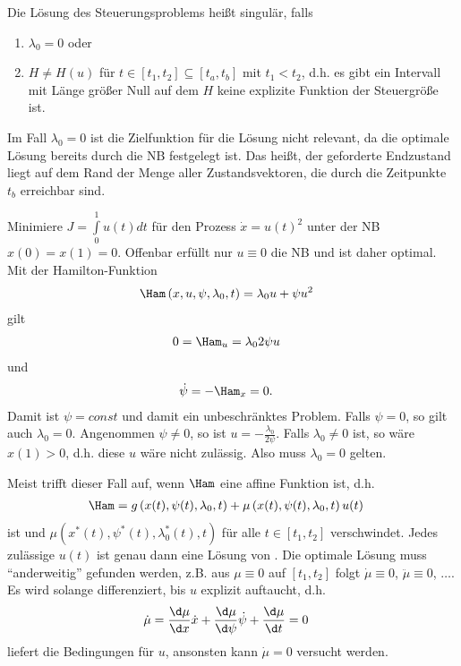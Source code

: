 \begin{defi}
Die Lösung des Steuerungsproblems heißt singulär, falls
\begin{enumerate}[label=(\Roman*)]
  \item $\lambda_0=0$ oder
  \item $H\neq H(u)$ für $t\in[t_1,t_2]\subseteq[t_a,t_b]$ mit $t_1<t_2$, d.h. es gibt ein Intervall mit Länge größer Null auf dem $H$ keine
  explizite Funktion der Steuergröße ist.
\end{enumerate}
\end{defi}

\begin{remark}
Im Fall $\lambda_0=0$ ist die Zielfunktion für die Lösung nicht relevant, da die optimale Lösung bereits durch die \ac{NB} festgelegt ist. Das heißt,
der geforderte Endzustand liegt auf dem Rand der Menge aller Zustandsvektoren, die durch die Zeitpunkte $t_b$ erreichbar sind. 
\end{remark}

\begin{exmp}
Minimiere $J = \int\limits_0^1 u(t)dt$ für den Prozess $\dot{x}=u(t)^2$ unter der \ac{NB} $x(0)=x(1)=0$. Offenbar erfüllt nur $u\equiv 0$ die \ac{NB}
und ist daher optimal. Mit der Hamilton-Funktion
\begin{align*}
	\Ham\left(x,u,\psi,\lambda_0,t \right) & = \lambda_0u + \psi u^2
\end{align*}
gilt
\begin{align*}
	0 & = \Ham_u = \lambda_0 2\psi u
\end{align*}
und
\begin{align*}
	\dot{\psi}& = -\Ham_x=0.
\end{align*} 
Damit ist $\psi=const$ und damit ein unbeschränktes Problem. Falls $\psi = 0$, so gilt auch $\lambda_0=0$. Angenommen $\psi\neq 0$, so ist
$u=-\frac{\lambda_0}{2\psi}$. Falls $\lambda_0\neq 0$ ist, so wäre $x(1)>0$, d.h. diese $u$ wäre nicht zulässig. Also muss $\lambda_0=0$ gelten.
\end{exmp}

\begin{remark}
Meist trifft dieser Fall auf, wenn $\Ham$ eine affine Funktion ist, d.h. 
\begin{align*}
	\Ham & = g\left(x(t),\psi(t),\lambda_0,t \right) + \mu\left(x(t),\psi(t),\lambda_0,t \right)u(t)
\end{align*}
ist und $\mu\left(x^{\ast}(t),\psi^{\ast}(t),\lambda_0^{\ast}(t),t \right)$ für alle $t\in[t_1,t_2]$ verschwindet. Jedes zulässige $u(t)$ ist genau
dann eine Lösung von . Die optimale Lösung muss "`anderweitig"' gefunden werden, z.B. aus $\mu\equiv 0$ auf
$[t_1,t_2]$ folgt $\dot{\mu}\equiv 0$, $\ddot{\mu}\equiv 0$, $\ldots$. Es wird solange differenziert, bis $u$ explizit auftaucht, d.h. 
\begin{align*}
	\dot{\mu} & = \frac{\d \mu}{\d x}\dot{x}+\frac{\d \mu}{\d \psi}\dot{\psi}+\frac{\d\mu}{\d t} = 0
\end{align*}
liefert die Bedingungen für $u$, ansonsten kann $\dot{\mu}=0$ versucht werden.
\end{remark}

